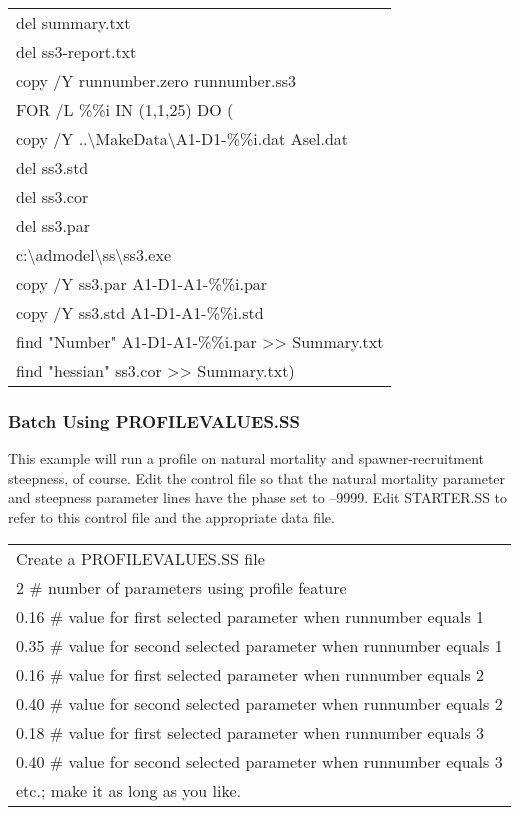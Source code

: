 \begin{center}
	\begin{longtable}{p{13cm}}
		del summary.txt\\
		del ss3-report.txt\\
		copy /Y runnumber.zero runnumber.ss3\\
		FOR /L \%\%i IN (1,1,25) DO (\\
		copy /Y ..\textbackslash MakeData\textbackslash A1-D1-\%\%i.dat  Asel.dat\\
		del ss3.std\\
		del ss3.cor\\
		del ss3.par\\
		c:\textbackslash admodel\textbackslash ss\textbackslash ss3.exe\\
		copy /Y ss3.par A1-D1-A1-\%\%i.par\\
		copy /Y ss3.std A1-D1-A1-\%\%i.std\\
		find "Number" A1-D1-A1-\%\%i.par >> Summary.txt\\
		find "hessian" ss3.cor >> Summary.txt)\\	
	\end{longtable}
\end{center}

\subsubsection{Batch Using PROFILEVALUES.SS}
This example will run a profile on natural mortality and spawner-recruitment steepness, of course.  Edit the control file so that the natural mortality parameter and steepness parameter lines have the phase set to –9999.  Edit STARTER.SS to refer to this control file and the appropriate data file.

\begin{center}
	\begin{longtable}{p{13cm}}		
		Create a PROFILEVALUES.SS file\\
		2	\# number of parameters using profile feature\\
		0.16	\# value for first selected parameter when runnumber equals 1\\
		0.35	\# value for second selected parameter when runnumber equals 1\\
		0.16	\# value for first selected parameter when runnumber equals 2\\
		0.40	\# value for second selected parameter when runnumber equals 2\\
		0.18	\# value for first selected parameter when runnumber equals 3\\
		0.40	\# value for second selected parameter when runnumber equals 3\\
		etc.;  make it as long as you like.\\
	\end{longtable}
\end{center}

